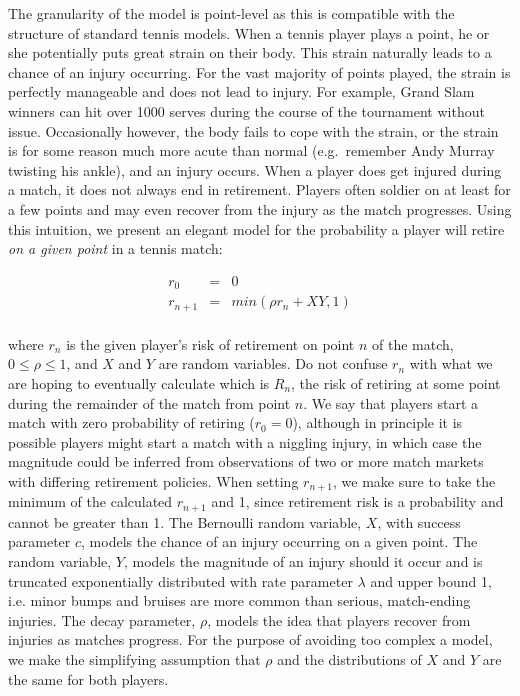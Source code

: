 \documentclass[authoryear, 12pt]{elsarticle}
\begin{document}
The granularity of the model is point-level as this is compatible with the structure of standard tennis models.  When a tennis player plays a point, he or she potentially puts great strain on their body.  This strain naturally leads to a chance of an injury occurring.  For the vast majority of points played, the strain is perfectly manageable and does not lead to injury.  For example, Grand Slam winners can hit over 1000 serves during the course of the tournament without issue.  Occasionally however, the body fails to cope with the strain, or the strain is for some reason much more acute than normal (e.g.\ remember Andy Murray twisting his ankle), and an injury occurs.  When a player does get injured during a match, it does not always end in retirement.  Players often soldier on at least for a few points and may even recover from the injury as the match progresses.  
Using this intuition, we present an elegant model for the probability a player will retire \textit{on a given point} in a tennis match:

\begin{center}
\begin{eqnarray*}
r_0 &=& 0 \\
r_{n+1} &=& min(\rho r_n + XY, 1) \\
\end{eqnarray*}
\end{center}

where $r_n$ is the given player's risk of retirement on point $n$ of the match, $0 \leq \rho \leq 1$, and $X$ and $Y$ are random variables.  Do not confuse $r_n$ with what we are hoping to eventually calculate which is $R_n$, the risk of retiring at some point during the remainder of the match from point $n$.  We say that players start a match with zero probability of retiring ($r_0 = 0$), although in principle it is possible players might start a match with a niggling injury, in which case the magnitude could be inferred from observations of two or more match markets with differing retirement policies.  When setting $r_{n+1}$, we make sure to take the minimum of the calculated $r_{n+1}$ and 1, since retirement risk is a probability and cannot be greater than 1.  The Bernoulli random variable, $X$, with success parameter $c$, models the chance of an injury occurring on a given point.  The random variable, $Y$, models the magnitude of an injury should it occur and is truncated exponentially distributed with rate parameter $\lambda$ and upper bound 1, i.e. minor bumps and bruises are more common than serious, match-ending injuries.  The decay parameter, $\rho$, models the idea that players recover from injuries as matches progress.  For the purpose of avoiding too complex a model, we make the simplifying assumption that $\rho$ and the distributions of $X$ and $Y$ are the same for both players.
\end{document}
